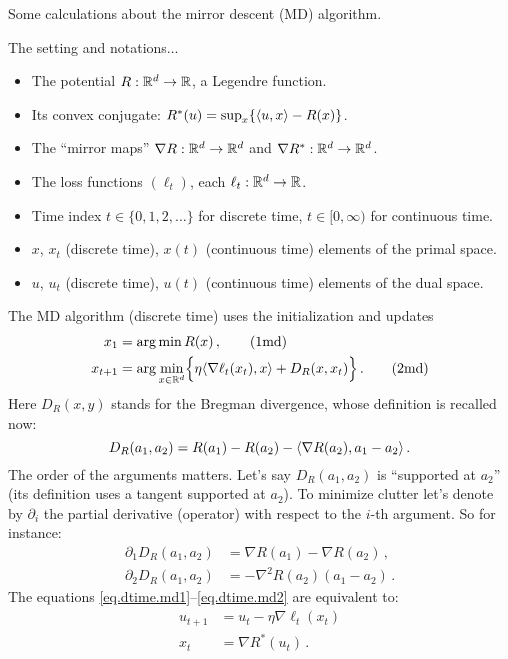 \documentclass[12pt]{article}
\theoremstyle{plain}
\theoremstyle{definition}
\theoremstyle{remark}
\begin{document}

Some calculations about the mirror descent (MD) algorithm.

\bigskip

\noindent
The setting and notations...
\begin{itemize}[leftmargin=*, itemsep=2pt]
\item The potential $R : \mathbb{R}^d \to \mathbb{R}$, a Legendre function.
\item Its convex conjugate: $R^{*}(u) = \sup_{x} \{ \langle {u,x}\rangle - R(x)\}$.
\item The ``mirror maps'' $\nabla R : \mathbb{R}^d \to \mathbb{R}^d$ and $\nabla R^{*} : \mathbb{R}^d \to \mathbb{R}^d$.
\item The loss functions $(\ell_t)$, each $\ell_t : \mathbb{R}^d \to \mathbb{R}$.
\item Time index $t \in \{ 0,1,2,\ldots \}$ for discrete time, $t \in [0,\infty)$ for continuous time.
\item $x$, $x_t$ (discrete time), $x(t)$ (continuous time) elements of the primal space.
\item $u$, $u_t$ (discrete time), $u(t)$ (continuous time) elements of the dual space.
\end{itemize}
The MD algorithm (discrete time) uses the initialization and updates
\begin{align}
x_1 &= \arg\min R(x)\,, \label{eq.dtime.md1} \tag{1md} \\
x_{t+1} &= \arg\min_{x \in \mathbb{R}^d} \Bigl\{ \eta \langle {\nabla\ell_t(x_{t}), x}\rangle + D_{R}(x, x_{t})\Bigr\}\,.
 \label{eq.dtime.md2} 
\tag{2md}
\end{align}
Here $D_{R}(x,y)$ stands for the Bregman divergence, whose definition is recalled now:
\[
D_{R}(a_{1}, a_{2}) = R(a_{1}) - R(a_{2}) - \langle {\nabla R(a_2), a_{1} - a_{2}}\rangle\,.
\]
The order of the arguments matters.
Let's say $D_{R}(a_{1},a_{2})$ is ``supported at $a_{2}$''
(its definition uses a tangent supported at $a_{2}$).
To minimize clutter let's denote by $\partial_{i}$ the partial derivative (operator)
with respect to the $i$-th argument. So for instance:
\begin{align*}
\partial_{1} D_{R}(a_{1}, a_{2}) &= \nabla R(a_{1}) - \nabla R(a_{2})\,, \\[1mm]
\partial_{2} D_{R}(a_{1}, a_{2}) &= - \nabla^2 R(a_{2})(a_{1} - a_{2})\,.
\end{align*}
The equations \eqref{eq.dtime.md1}--\eqref{eq.dtime.md2} are equivalent to:
\begin{align*}
u_{t+1} &= u_{t} - \eta \nabla \ell_{t}(x_{t}) \label{eq.dtime.1} \tag{1dt} \\
x_{t} &= \nabla R^{*}(u_{t})\,. \label{eq.dtime.2} \tag{2dt}
\end{align*}
\end{document}
